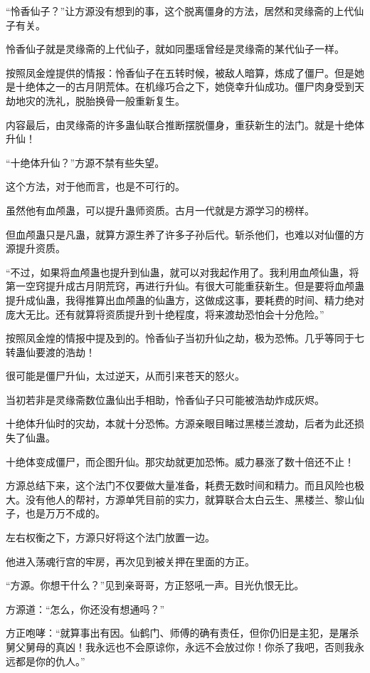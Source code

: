 \begin{this_body}
“怜香仙子？”让方源没有想到的事，这个脱离僵身的方法，居然和灵缘斋的上代仙子有关。

怜香仙子就是灵缘斋的上代仙子，就如同墨瑶曾经是灵缘斋的某代仙子一样。

按照凤金煌提供的情报：怜香仙子在五转时候，被敌人暗算，炼成了僵尸。但是她是十绝体之一的古月阴荒体。在机缘巧合之下，她侥幸升仙成功。僵尸肉身受到天劫地灾的洗礼，脱胎换骨一般重新复生。

内容最后，由灵缘斋的许多蛊仙联合推断摆脱僵身，重获新生的法门。就是十绝体升仙！

“十绝体升仙？”方源不禁有些失望。

这个方法，对于他而言，也是不可行的。

虽然他有血颅蛊，可以提升蛊师资质。古月一代就是方源学习的榜样。

但血颅蛊只是凡蛊，就算方源生养了许多子孙后代。斩杀他们，也难以对仙僵的方源提升资质。

“不过，如果将血颅蛊也提升到仙蛊，就可以对我起作用了。我利用血颅仙蛊，将第一空窍提升成古月阴荒窍，再进行升仙。有很大可能重获新生。但是要将血颅蛊提升成仙蛊，我得推算出血颅蛊的仙蛊方，这做成这事，要耗费的时间、精力绝对庞大无比。还有就算将资质提升到十绝程度，将来渡劫恐怕会十分危险。”

按照凤金煌的情报中提及到的。怜香仙子当初升仙之劫，极为恐怖。几乎等同于七转蛊仙要渡的浩劫！

很可能是僵尸升仙，太过逆天，从而引来苍天的怒火。

当初若非是灵缘斋数位蛊仙出手相助，怜香仙子只可能被浩劫炸成灰烬。

十绝体升仙时的灾劫，本就十分恐怖。方源亲眼目睹过黑楼兰渡劫，后者为此还损失了仙蛊。

十绝体变成僵尸，而企图升仙。那灾劫就更加恐怖。威力暴涨了数十倍还不止！

方源总结下来，这个法门不仅要做大量准备，耗费无数时间和精力。而且风险也极大。没有他人的帮衬，方源单凭目前的实力，就算联合太白云生、黑楼兰、黎山仙子，也是万万不成的。

左右权衡之下，方源只好将这个法门放置一边。

他进入荡魂行宫的牢房，再次见到被关押在里面的方正。

“方源。你想干什么？”见到亲哥哥，方正怒吼一声。目光仇恨无比。

方源道：“怎么，你还没有想通吗？”

方正咆哮：“就算事出有因。仙鹤门、师傅的确有责任，但你仍旧是主犯，是屠杀舅父舅母的真凶！我永远也不会原谅你，永远不会放过你！你杀了我吧，否则我永远都是你的仇人。”


\end{this_body}
